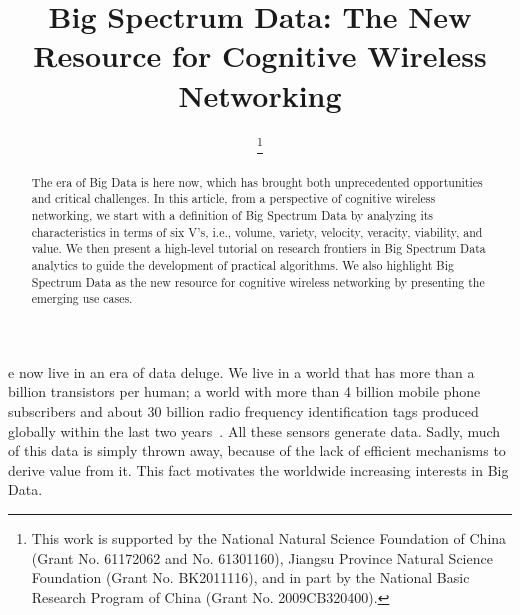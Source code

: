 \documentclass[12pt,draftcls,journal,letterpaper,oneside,onecolumn]{IEEEtran}
\date{}
\begin{document}
\title{Big Spectrum Data: The New Resource for Cognitive Wireless Networking}


\author{
\thanks{This work is supported by the National Natural Science Foundation of China (Grant No. 61172062 and No. 61301160), Jiangsu Province Natural Science Foundation (Grant No. BK2011116), and in part by the National Basic Research Program of China (Grant No. 2009CB320400).}}
\maketitle


\begin{abstract}
The era of Big Data is here now, which has brought both unprecedented opportunities and critical challenges. In this article, from a perspective of cognitive wireless networking, we start with a definition of Big Spectrum Data by analyzing its characteristics in terms of six V's, i.e., volume, variety, velocity, veracity, viability, and value. We then present a high-level tutorial on research frontiers in Big Spectrum Data analytics to guide the development of practical algorithms. We also highlight Big Spectrum Data as the new resource for cognitive wireless networking by presenting the emerging use cases.
\end{abstract}




\IEEEpeerreviewmaketitle


e now live in an era of data deluge. We live in a world that has more than a billion transistors per human; a world with more than 4 billion mobile phone subscribers and about 30 billion radio frequency identification tags produced globally within the last two years~\cite{Understanding-Big-Data}. All these sensors generate data. Sadly, much of this data is simply thrown away, because of the lack of efficient mechanisms to derive value from it. This fact motivates the worldwide increasing interests in Big Data.
\end{document}
